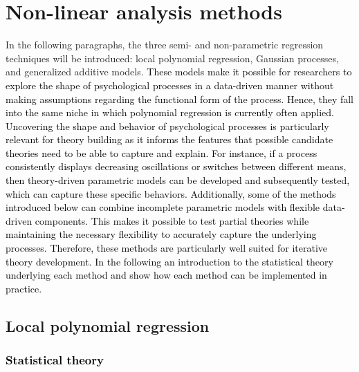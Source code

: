 \documentclass[man, floatsintext]{apa7}
\begin{document}
\section{Non-linear analysis methods}\label{method_introduction}

In the following paragraphs, the three semi- and non-parametric regression
techniques will be introduced: local polynomial regression, Gaussian processes,
and generalized additive models. \textcolor{black}{ These models make it
  possible for researchers to explore the shape of psychological processes in a
  data-driven manner without making assumptions regarding the functional form
  of
  the process. Hence, they fall into the same niche in which polynomial
  regression is currently often applied. Uncovering the shape and behavior of
  psychological processes is particularly relevant for theory building as it
  informs the features that possible candidate theories need to be able to
  capture and explain. For instance, if a process consistently displays
  decreasing oscillations or switches between different means, then
  theory-driven
  parametric models can be developed and subsequently tested, which can capture
  these specific behaviors. Additionally, some of the methods introduced below
  can combine incomplete parametric models with flexible data-driven
  components. This makes it possible to test partial theories while maintaining
  the necessary flexibility to accurately capture the underlying processes.
  Therefore, these methods are particularly well suited for iterative theory
  development. In the following an introduction to the statistical theory
  underlying each method and show how each method can be implemented in
  practice.}

\subsection{Local polynomial regression}

\subsubsection{\textcolor{black}{Statistical theory}}
\end{document}
